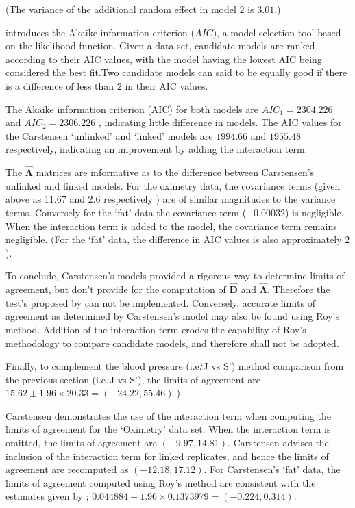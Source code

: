 \documentclass[12pt, a4paper]{report}
\theoremstyle{plain}
\theoremstyle{definition}
\theoremstyle{remark}
\begin{document}
	\noindent (The variance of the additional random effect in model $2$ is $3.01$.)
	
	\citet{akaike} introduces the Akaike information criterion ($AIC$), a model
	selection tool based on the likelihood function. Given a data set, candidate models
	are ranked according to their AIC values, with the model having the lowest AIC being considered the best fit.Two candidate models can said to be equally good if there is a difference of less than $2$ in their AIC values.
	
	The Akaike information criterion (AIC) for both models are $AIC_{1} = 2304.226$ and $AIC_{2} = 2306.226$ , indicating little difference in models. The AIC values for the Carstensen `unlinked' and `linked' models are $1994.66$ and $1955.48$ respectively, indicating an improvement by adding the interaction term.
	
	The $\boldsymbol{\hat{\Lambda}}$ matrices are informative as to the difference between Carstensen's unlinked and linked models. For the oximetry data, the covariance terms (given above as 11.67 and 2.6 respectively ) are of similar magnitudes to the variance terms. Conversely for the `fat' data the covariance term ($-0.00032$) is negligible. When the interaction term is added to the model, the covariance term remains negligible. (For the `fat' data, the difference in AIC values is also approximately $2$).
	
	To conclude, Carstensen's models provided a rigorous way to determine limits of agreement, but don't provide for the computation of $\boldsymbol{\hat{D}}$ and $\boldsymbol{\hat{\Lambda}}$. Therefore the test's proposed by \citet{ARoy2009} can not be implemented. Conversely, accurate limits of agreement as determined by Carstensen's model may also be found using Roy's method. Addition of the interaction term erodes the capability of Roy's methodology to compare candidate models, and therefore shall not be adopted.
	
	Finally, to complement the blood pressure (i.e.`J vs S') method comparison from the previous section (i.e.`J vs S'), the limits of agreement are $15.62 \pm 1.96 \times 20.33 = (-24.22, 55.46)$.)
	\newpage
	
	Carstensen demonstrates the use of the interaction term when computing the limits of agreement for the `Oximetry' data set. When the interaction term is omitted, the limits of agreement are $(-9.97, 14.81)$. Carstensen advises the inclusion of the interaction term for linked replicates, and hence the limits of agreement are recomputed as $(-12.18,17.12)$.
	\newpage
	For Carstensen's `fat' data, the limits of agreement computed using Roy's
	method are consistent with the estimates given by \citet{BXC2008}; $0.044884  \pm 1.96 \times  0.1373979 = (-0.224,  0.314).$
	
\end{document}
